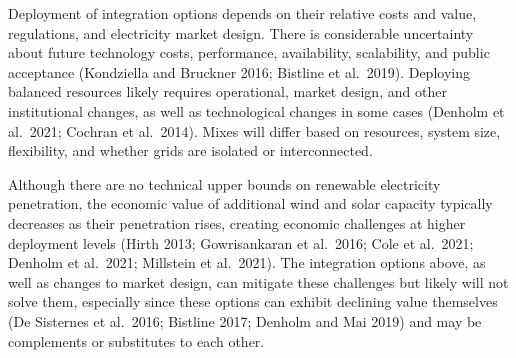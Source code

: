 \documentclass[
  letterpaper,
  DIV=11,
  numbers=noendperiod]{scrreprt}
\begin{document}
Deployment of integration options depends on their relative costs and
value, regulations, and electricity market design. There is considerable
uncertainty about future technology costs, performance, availability,
scalability, and public acceptance (Kondziella and Bruckner 2016;
Bistline et al.~2019). Deploying balanced resources likely requires
operational, market design, and other institutional changes, as well as
technological changes in some cases (Denholm et al.~2021; Cochran et
al.~2014). Mixes will differ based on resources, system size,
flexibility, and whether grids are isolated or interconnected.

Although there are no technical upper bounds on renewable electricity
penetration, the economic value of additional wind and solar capacity
typically decreases as their penetration rises, creating economic
challenges at higher deployment levels (Hirth 2013; Gowrisankaran et
al.~2016; Cole et al.~2021; Denholm et al.~2021; Millstein et al.~2021).
The integration options above, as well as changes to market design, can
mitigate these challenges but likely will not solve them, especially
since these options can exhibit declining value themselves (De Sisternes
et al.~2016; Bistline 2017; Denholm and Mai 2019) and may be complements
or substitutes to each other.
\end{document}
